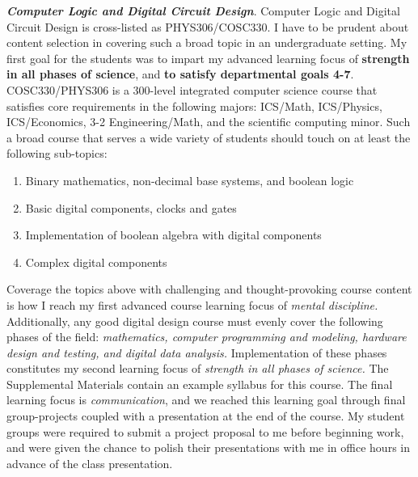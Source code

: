\documentclass[../../../main.tex]{subfiles}
\begin{document}
\label{sec:adv_desc}

\textbf{\textit{Computer Logic and Digital Circuit Design}}. Computer Logic and Digital Circuit Design is cross-listed as PHYS306/COSC330.  I have to be prudent about content selection in covering such a broad topic in an undergraduate setting. My first goal for the students was to impart my advanced learning focus of \textbf{strength in all phases of science}, and \textbf{to satisfy departmental goals 4-7}.  COSC330/PHYS306 is a 300-level integrated computer science course that satisfies core requirements in the following majors: ICS/Math, ICS/Physics, ICS/Economics, 3-2 Engineering/Math, and the scientific computing minor.  Such a broad course that serves a wide variety of students should touch on at least the following sub-topics:

\begin{enumerate}
\item Binary mathematics, non-decimal base systems, and boolean logic
\item Basic digital components, clocks and gates
\item Implementation of boolean algebra with digital components
\item Complex digital components
\end{enumerate}

Coverage the topics above with challenging and thought-provoking course content is how I reach my first advanced course learning focus of \textit{mental discipline.}  Additionally, any good digital design course must evenly cover the following phases of the field: \textit{mathematics, computer programming and modeling, hardware design and testing, and digital data analysis.}  Implementation of these phases constitutes my second learning focus of \textit{strength in all phases of science.}  The Supplemental Materials contain an example syllabus for this course.  The final learning focus is \textit{communication}, and we reached this learning goal through final group-projects coupled with a presentation at the end of the course.  My student groups were required to submit a project proposal to me before beginning work, and were given the chance to polish their presentations with me in office hours in advance of the class presentation. \\ \hspace{0.1cm}
\end{document}
